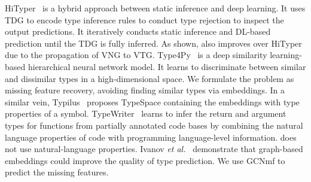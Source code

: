 HiTyper~\cite{HiTyper-icse22} is a hybrid approach between static
inference and deep learning. It uses TDG to encode type inference
rules to conduct type rejection to inspect the output predictions. It
iteratively conducts static inference and DL-based prediction until
the TDG is fully inferred.
As shown, {\tool} also improves over HiTyper due to the propagation of
VNG to VTG.
%
Type4Py~\cite{Type4Py-icse22} is a deep similarity learning-based
hierarchical neural network model. It learns to discriminate between
similar and dissimilar types in a high-dimensional space.
We formulate the problem as missing feature recovery,
avoiding finding similar types via embeddings.
In a similar vein, Typilus~\cite{typilus-pldi20} proposes TypeSpace
containing the embeddings with type properties of a
symbol. TypeWriter~\cite{typewriter-fse20} learns to infer the return
and argument types for functions from partially annotated code bases
by combining the natural language properties of code with programming
language-level information. {\tool} does not use natural-language
properties. Ivanov {\em et al.}~\cite{ivanov21predicting} demonstrate
that graph-based embeddings could improve the quality of type
prediction. We use GCNmf to predict the missing features.



